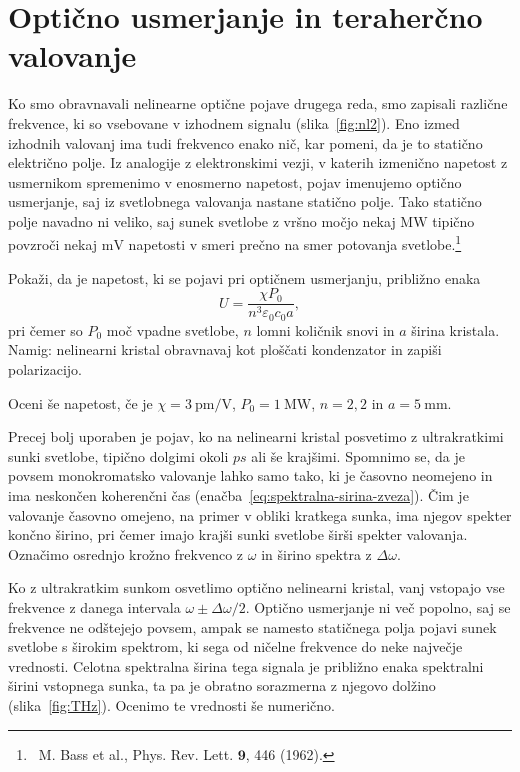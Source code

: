 \section{Optično usmerjanje in teraherčno valovanje}
Ko smo obravnavali nelinearne optične pojave drugega reda, smo zapisali
različne frekvence, ki so vsebovane v izhodnem signalu (slika~\ref{fig:nl2}). Eno izmed
izhodnih valovanj ima tudi frekvenco enako nič, kar pomeni, da je to statično električno polje. Iz analogije
z elektronskimi vezji, v katerih izmenično napetost z usmernikom spremenimo v enosmerno napetost, 
pojav imenujemo optično usmerjanje, saj iz svetlobnega valovanja nastane statično polje. Tako statično 
polje navadno ni veliko, saj sunek svetlobe z vršno močjo nekaj $\si{\mega\watt}$ tipično povzroči 
nekaj $\si{\milli\volt}$ napetosti v smeri prečno na smer potovanja svetlobe.\footnote{~M. Bass
et al., Phys. Rev. Lett. $\mathbf{9}$, 446 (1962).}

\begin{definition}
Pokaži, da je napetost, ki se pojavi pri optičnem usmerjanju, približno enaka
\begin{equation}
U = \frac{\chi P_0}{n^3 \varepsilon_0 c_0 a},
\end{equation}
pri čemer so $P_0$ moč vpadne svetlobe, $n$ lomni količnik snovi in $a$ širina kristala.
Namig: nelinearni kristal obravnavaj kot ploščati kondenzator in zapiši polarizacijo.

Oceni še napetost, če je
$\chi = 3~\si{\pico\meter/\volt}$, $P_0 = 1~\si{\mega\watt}$, $n = 2,2$ in $a = 5~\si{\milli\metre}$. 
\end{definition}

Precej bolj uporaben je pojav, ko na nelinearni kristal posvetimo z ultrakratkimi 
sunki svetlobe, tipično dolgimi okoli $\si{ps}$ ali še krajšimi. Spomnimo se, da je povsem 
monokromatsko valovanje lahko samo tako, ki je časovno neomejeno in ima neskončen koherenčni čas
(enačba~\ref{eq:spektralna-sirina-zveza}). 
Čim je valovanje časovno omejeno, na primer v obliki kratkega sunka, ima njegov spekter 
končno širino, pri čemer imajo krajši sunki svetlobe širši spekter valovanja. Označimo 
osrednjo krožno frekvenco z $\omega$ in širino spektra z $\Delta \omega$. 

Ko z ultrakratkim sunkom osvetlimo optično 
nelinearni kristal, vanj vstopajo vse frekvence z danega intervala $\omega \pm \Delta \omega/2$.
Optično usmerjanje ni več popolno, saj se frekvence ne odštejejo povsem, ampak se 
namesto statičnega polja pojavi sunek svetlobe s širokim spektrom, ki sega od ničelne
frekvence do neke največje vrednosti. Celotna spektralna širina tega signala je 
približno enaka spektralni širini vstopnega sunka, ta pa je obratno sorazmerna z njegovo dolžino
(slika~\ref{fig:THz}).
Ocenimo te vrednosti še numerično. 

